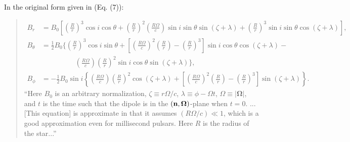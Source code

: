 \documentclass{book}
\begin{document}
In the original form given in \citet{Barnard1986} (Eq. (7)):
\begin{quote}
\begin{equation}
    \begin{aligned}
        B_r &= B_0 \left[\left(\frac{R}{r}\right)^3 \cos i \cos \theta +
               \left(\frac{R}{r}\right)^2\left(\frac{R\Omega}{c}\right) \sin i \sin \theta \sin(\zeta + \lambda) +
               \left(\frac{R}{r}\right)^3 \sin i \sin \theta \cos(\zeta + \lambda)\right], \\
        B_\theta &= \frac{1}{2}B_0 \Bigg\{\left(\frac{R}{r}\right)^3 \cos i \sin \theta +
                    \left[\left(\frac{R\Omega}{c}\right)^2\left(\frac{R}{r}\right) - \left(\frac{R}{r}\right)^3\right] \sin i \cos \theta \cos(\zeta + \lambda) - \\
            &\hspace{2cm}
                    \left(\frac{R\Omega}{c}\right)\left(\frac{R}{r}\right)^2 \sin i \cos \theta \sin(\zeta + \lambda)\Bigg\}, \\
        B_\phi &= -\frac{1}{2} B_0 \sin i \left\{\left(\frac{R\Omega}{c}\right)\left(\frac{R}{r}\right)^2 \cos(\zeta + \lambda) +
                  \left[\left(\frac{R\Omega}{c}\right)^2\left(\frac{R}{r}\right) - \left(\frac{R}{r}\right)^3\right] \sin(\zeta + \lambda)\right\}.
    \end{aligned}
\end{equation}
    ``Here $B_0$ is an arbitrary normalization, $\zeta \equiv r\Omega/c$, $\lambda \equiv \phi - \Omega t$, $\Omega \equiv |{\bm \Omega}|$, and $t$ is the time such that the dipole is in the $({\bf n}, {\bm \Omega})$-plane when $t = 0$.
    ...
    [This equation] is approximate in that it assumes $(R\Omega/c) \ll 1$, which is a good approximation even for millisecond pulsars.
    Here $R$ is the radius of the star...''
\end{quote}
\end{document}
